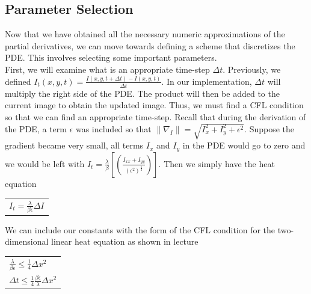 \documentclass{article}
\begin{document}
  \newpage
  \subsection{Parameter Selection}
  \noindent
  Now that we have obtained all the necessary numeric approximations of the partial derivatives, we
  can move towards defining a scheme that discretizes the PDE. This involves selecting
  some important parameters.\\

  \noindent
  First, we will examine what is an appropriate time-step $\Delta t$. Previously,
  we defined $I_{t}(x,y,t) = \frac{I(x,y,t+\Delta t) - I(x,y,t)}{\Delta t}$. In our implementation,
  $\Delta t$ will multiply the right side of the PDE. The product will then be added to
  the current image to obtain the updated image. Thus, we must find a CFL condition
  so that we can find an appropriate time-step. Recall that during the derivation of
  the PDE, a term $\epsilon$ was included so that $\| \nabla_{I} \| = \sqrt{I_{x}^2 + I_{y}^2 + \epsilon^2}$.
  Suppose the gradient became very small, all terms $I_{x}$ and $I_{y}$ in the PDE would go to zero and 
  we would be left with $I_{t} = \frac{\lambda}{\beta}[(\frac{I_{xx}+I_{yy}}{(\epsilon^2)^\frac{1}{2}})]$.
  Then we simply have the heat equation
  \begin{center}
    \begin{tabular}{l}
      $I_{t} = \frac{\lambda}{\beta \epsilon}\Delta I$
    \end{tabular}
  \end{center}

  \noindent
  We can include our constants with the form of the CFL condition for the two-dimensional linear heat equation
  as shown in lecture
  \begin{center}
    \begin{tabular}{l}
      \vspace{12pt}
      $\frac{\lambda}{\beta \epsilon} \leq \frac{1}{4} \Delta x^2$\\
      $\Delta t \leq \frac{1}{4} \frac{\beta \epsilon}{\lambda} \Delta x^2$\\
    \end{tabular}
  \end{center}
\end{document}
